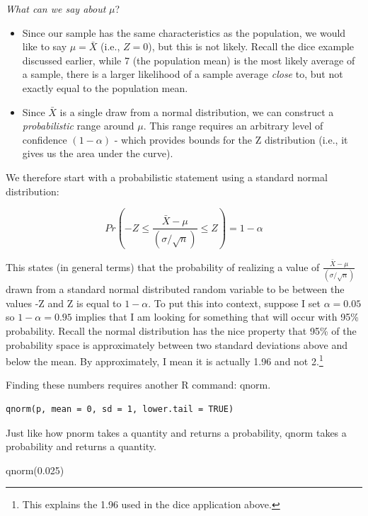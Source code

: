 \documentclass[
]{book}
\newenvironment{Shaded}{\begin{snugshade}}{\end{snugshade}}
\newcommand{\FloatTok}[1]{\textcolor[rgb]{0.00,0.00,0.81}{#1}}
\newcommand{\FunctionTok}[1]{\textcolor[rgb]{0.00,0.00,0.00}{#1}}
\newcommand{\NormalTok}[1]{#1}
\begin{document}
\emph{What can we say about} \(\mu\)?

\begin{itemize}
\item
  Since our sample has the same characteristics as the population, we would like to say \(\mu = \bar{X}\) (i.e., \(Z=0\)), but this is not likely. Recall the dice example discussed earlier, while 7 (the population mean) is the most likely average of a sample, there is a larger likelihood of a sample average \emph{close} to, but not exactly equal to the population mean.
\item
  Since \(\bar{X}\) is a single draw from a normal distribution, we can construct a \emph{probabilistic} range around \(\mu\). This range requires an arbitrary level of confidence \((1-\alpha)\) - which provides bounds for the Z distribution (i.e., it gives us the area under the curve).
\end{itemize}

We therefore start with a probabilistic statement using a standard normal distribution:

\[Pr\left(-Z \leq \frac{\bar{X}-\mu}{(\sigma/\sqrt{n})} \leq Z\right)=1-\alpha\]

This states (in general terms) that the probability of realizing a value of \(\frac{\bar{X}-\mu}{(\sigma/\sqrt{n})}\) drawn from a standard normal distributed random variable to be between the values -Z and Z is equal to \(1-\alpha\). To put this into context, suppose I set \(\alpha=0.05\) so \(1-\alpha=0.95\) implies that I am looking for something that will occur with 95\% probability. Recall the normal distribution has the nice property that 95\% of the probability space is approximately between two standard deviations above and below the mean. By approximately, I mean it is actually 1.96 and not 2.\footnote{This explains the 1.96 used in the dice application above.}

Finding these numbers requires another R command: qnorm.

\begin{verbatim}
qnorm(p, mean = 0, sd = 1, lower.tail = TRUE)
\end{verbatim}

Just like how pnorm takes a quantity and returns a probability, qnorm takes a probability and returns a quantity.

\begin{Shaded}
\begin{Highlighting}[]
\FunctionTok{qnorm}\NormalTok{(}\FloatTok{0.025}\NormalTok{)}
\end{Highlighting}
\end{Shaded}
\end{document}
